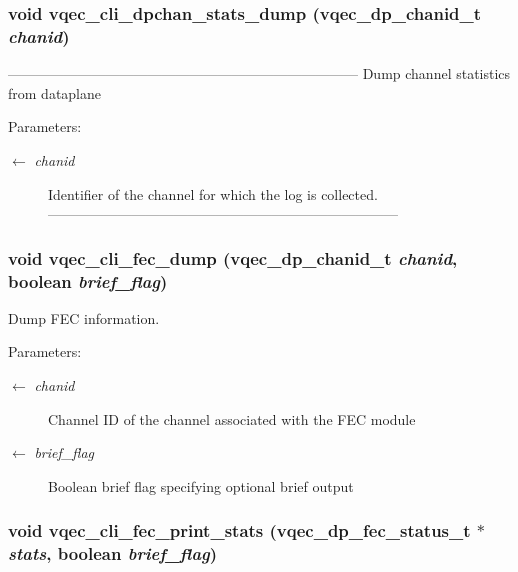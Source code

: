\subsubsection{\setlength{\rightskip}{0pt plus 5cm}void vqec\_\-cli\_\-dpchan\_\-stats\_\-dump (vqec\_\-dp\_\-chanid\_\-t {\em chanid})}\label{vqec__cli__interface_8c_b70d2621906c01cf3c5874319926fe68}


--------------------------------------------------------------------------- Dump channel statistics from dataplane

\begin{Desc}
\item[Parameters:]
\begin{description}
\item[\mbox{$\leftarrow$} {\em chanid}]Identifier of the channel for which the log is collected. --------------------------------------------------------------------------- \end{description}
\end{Desc}
\subsubsection{\setlength{\rightskip}{0pt plus 5cm}void vqec\_\-cli\_\-fec\_\-dump (vqec\_\-dp\_\-chanid\_\-t {\em chanid}, boolean {\em brief\_\-flag})}\label{vqec__cli__interface_8c_440176cbfc55e70c9de15c9adfa1342b}


Dump FEC information.

\begin{Desc}
\item[Parameters:]
\begin{description}
\item[\mbox{$\leftarrow$} {\em chanid}]Channel ID of the channel associated with the FEC module \item[\mbox{$\leftarrow$} {\em brief\_\-flag}]Boolean brief flag specifying optional brief output \end{description}
\end{Desc}
\subsubsection{\setlength{\rightskip}{0pt plus 5cm}void vqec\_\-cli\_\-fec\_\-print\_\-stats (vqec\_\-dp\_\-fec\_\-status\_\-t $\ast$ {\em stats}, boolean {\em brief\_\-flag})}\label{vqec__cli__interface_8c_8275b0a6e78d2e731d637b82b570b633}


